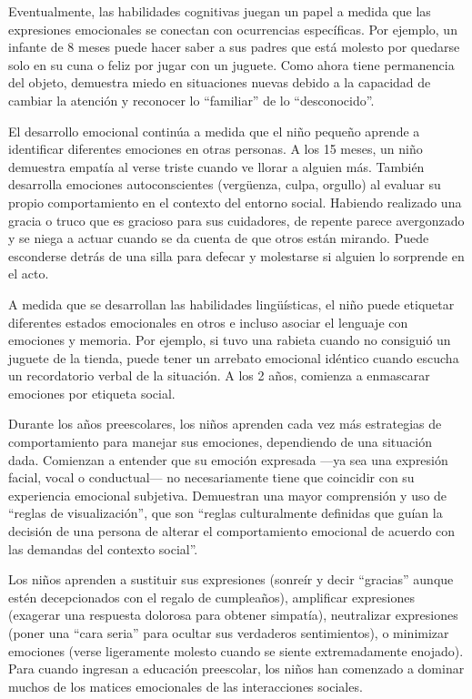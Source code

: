 \documentclass[11pt,letterpaper]{report}
\begin{document}
Eventualmente, las habilidades cognitivas juegan un papel a medida que las
expresiones emocionales se conectan con ocurrencias específicas. Por ejemplo,
un infante de 8 meses puede hacer saber a sus padres que está molesto por
quedarse solo en su cuna o feliz por jugar con un juguete. Como ahora tiene
permanencia del objeto, demuestra miedo en situaciones nuevas debido a la
capacidad de cambiar la atención y reconocer lo ``familiar'' de lo
``desconocido''. \cite{Gerber2011}

El desarrollo emocional continúa a medida que el niño pequeño aprende a
identificar diferentes emociones en otras personas. A los 15 meses, un niño
demuestra empatía al verse triste cuando ve llorar a alguien más. También
desarrolla emociones autoconscientes (vergüenza, culpa, orgullo) al evaluar su
propio comportamiento en el contexto del entorno social. Habiendo realizado una
gracia o truco que es gracioso para sus cuidadores, de repente parece
avergonzado y se niega a actuar cuando se da cuenta de que otros están mirando.
Puede esconderse detrás de una silla para defecar y molestarse si alguien lo
sorprende en el acto. \cite{Gerber2011}

A medida que se desarrollan las habilidades lingüísticas, el niño puede
etiquetar diferentes estados emocionales en otros e incluso asociar el lenguaje
con emociones y memoria. Por ejemplo, si tuvo una rabieta cuando no consiguió
un juguete de la tienda, puede tener un arrebato emocional idéntico cuando
escucha un recordatorio verbal de la situación. A los 2 años, comienza a
enmascarar emociones por etiqueta social. \cite{Gerber2011}

Durante los años preescolares, los niños aprenden cada vez más estrategias de
comportamiento para manejar sus emociones, dependiendo de una situación dada.
Comienzan a entender que su emoción expresada —ya sea una expresión facial,
vocal o conductual— no necesariamente tiene que coincidir con su experiencia
emocional subjetiva. Demuestran una mayor comprensión y uso de ``reglas de
visualización'', que son ``reglas culturalmente definidas que guían la decisión
de una persona de alterar el comportamiento emocional de acuerdo con las
demandas del contexto social''. \cite{ZEMAN2006}

Los niños aprenden a sustituir sus expresiones (sonreír y decir ``gracias''
aunque estén decepcionados con el regalo de cumpleaños), amplificar expresiones
(exagerar una respuesta dolorosa para obtener simpatía), neutralizar
expresiones (poner una ``cara seria'' para ocultar sus verdaderos sentimientos),
o minimizar emociones (verse ligeramente molesto cuando se siente
extremadamente enojado). Para cuando ingresan a educación preescolar, los niños
han comenzado a dominar muchos de los matices emocionales de las interacciones
sociales. \cite{Gerber2011}
\end{document}

